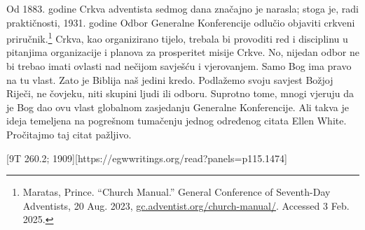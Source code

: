 Od 1883. godine Crkva adventista sedmog dana značajno je narasla; stoga je, radi praktičnosti, 1931. godine Odbor Generalne Konferencije odlučio objaviti crkveni priručnik.\footnote{Maratas, Prince. “Church Manual.” General Conference of Seventh-Day Adventists, 20 Aug. 2023, \href{https://gc.adventist.org/church-manual/}{gc.adventist.org/church-manual/}. Accessed 3 Feb. 2025.} Crkva, kao organizirano tijelo, trebala bi provoditi red i disciplinu u pitanjima organizacije i planova za prosperitet misije Crkve. No, nijedan odbor ne bi trebao imati ovlasti nad nečijom savješću i vjerovanjem. Samo Bog ima pravo na tu vlast. Zato je Biblija naš jedini kredo. Podlažemo svoju savjest Božjoj Riječi, ne čovjeku, niti skupini ljudi ili odboru. Suprotno tome, mnogi vjeruju da je Bog dao ovu vlast globalnom zasjedanju Generalne Konferencije. Ali takva je ideja temeljena na pogrešnom tumačenju jednog određenog citata Ellen White. Pročitajmo taj citat pažljivo.

[9T 260.2; 1909][https://egwwritings.org/read?panels=p115.1474]

